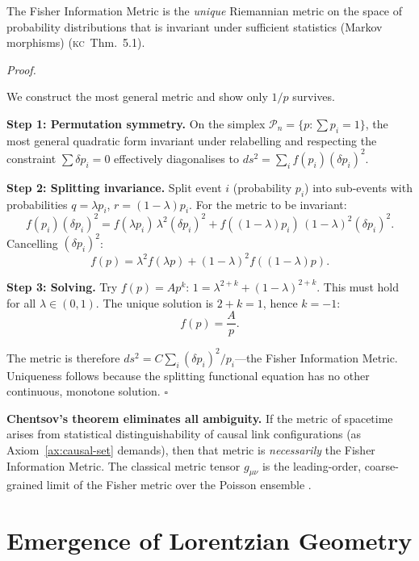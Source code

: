 \documentclass[11pt, a4paper, openany]{book}
\newcommand{\KC}[1]{\textnormal{(\textsc{kc}~#1)}}
\newcounter{thm}[chapter]
\renewenvironment{proof}[1][Proof]{%
  \par\noindent\textit{#1.}\quad
}{\hfill$\square$\par\medskip}
\begin{document}
\begin{theorem}[Chentsov]\label{thm:chentsov}
The Fisher Information Metric is the \emph{unique} Riemannian metric on
the space of probability distributions that is invariant under sufficient
statistics (Markov morphisms) \KC{Thm.~5.1}.
\end{theorem}

\begin{proof}
We construct the most general metric and show only $1/p$ survives.

\textbf{Step 1: Permutation symmetry.} On the simplex
$\mathcal{P}_n = \{p : \sum p_i = 1\}$, the most general quadratic form
invariant under relabelling and respecting the constraint $\sum\delta
p_i = 0$ effectively diagonalises to $ds^2 = \sum_i f(p_i)(\delta p_i)^2$.

\textbf{Step 2: Splitting invariance.} Split event $i$ (probability $p_i$)
into sub-events with probabilities $q = \lambda p_i$, $r = (1-\lambda)p_i$.
For the metric to be invariant:
\[
  f(p_i)(\delta p_i)^2
  = f(\lambda p_i)\,\lambda^2(\delta p_i)^2
  + f((1-\lambda)p_i)\,(1-\lambda)^2(\delta p_i)^2.
\]
Cancelling $(\delta p_i)^2$:
\[
  f(p) = \lambda^2 f(\lambda p) + (1-\lambda)^2 f((1-\lambda)p).
\]

\textbf{Step 3: Solving.} Try $f(p) = Ap^k$:
$1 = \lambda^{2+k} + (1-\lambda)^{2+k}$. This must hold for all
$\lambda \in (0,1)$. The unique solution is $2 + k = 1$, hence $k = -1$:
\[
  f(p) = \frac{A}{p}.
\]

The metric is therefore $ds^2 = C\sum_i (\delta p_i)^2/p_i$---the
Fisher Information Metric. Uniqueness follows because the splitting
functional equation has no other continuous, monotone solution.
\end{proof}

\begin{tcolorbox}[colback=thirdlight,colframe=third,title=Foundational Consequence]
\textbf{Chentsov's theorem eliminates all ambiguity.} If the metric of
spacetime arises from statistical distinguishability of causal link
configurations (as Axiom~\ref{ax:causal-set} demands), then that metric
is \emph{necessarily} the Fisher Information Metric. The classical metric
tensor $g_{\mu\nu}$ is the leading-order, coarse-grained limit of the
Fisher metric over the Poisson ensemble \cite{chentsov1982}.
\end{tcolorbox}

\section{Emergence of Lorentzian Geometry}\label{sec:emergence-lorentzian}
\end{document}
